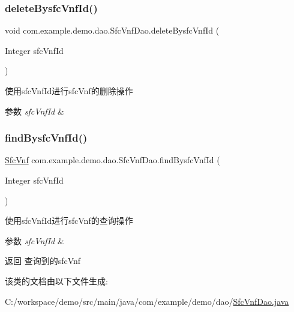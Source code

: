 \subsubsection{\texorpdfstring{delete\+Bysfc\+Vnf\+Id()}{deleteBysfcVnfId()}}
{\footnotesize\ttfamily void com.\+example.\+demo.\+dao.\+Sfc\+Vnf\+Dao.\+delete\+Bysfc\+Vnf\+Id (\begin{DoxyParamCaption}\item[{Integer}]{sfc\+Vnf\+Id }\end{DoxyParamCaption})}

使用sfc\+Vnf\+Id进行sfc\+Vnf的删除操作 
\begin{DoxyParams}{参数}
{\em sfc\+Vnf\+Id} & \\
\hline
\end{DoxyParams}
\mbox{\label{interfacecom_1_1example_1_1demo_1_1dao_1_1_sfc_vnf_dao_a2b0be412a2ac9b8c9413e4e9b7eddb40}} 
\subsubsection{\texorpdfstring{find\+Bysfc\+Vnf\+Id()}{findBysfcVnfId()}}
{\footnotesize\ttfamily \mbox{\hyperlink{classcom_1_1example_1_1demo_1_1modular_1_1_sfc_vnf}{Sfc\+Vnf}} com.\+example.\+demo.\+dao.\+Sfc\+Vnf\+Dao.\+find\+Bysfc\+Vnf\+Id (\begin{DoxyParamCaption}\item[{Integer}]{sfc\+Vnf\+Id }\end{DoxyParamCaption})}

使用sfc\+Vnf\+Id进行sfc\+Vnf的查询操作 
\begin{DoxyParams}{参数}
{\em sfc\+Vnf\+Id} & \\
\hline
\end{DoxyParams}
\begin{DoxyReturn}{返回}
查询到的sfc\+Vnf 
\end{DoxyReturn}


该类的文档由以下文件生成\+:\begin{DoxyCompactItemize}
\item 
C\+:/workspace/demo/src/main/java/com/example/demo/dao/\mbox{\hyperlink{_sfc_vnf_dao_8java}{Sfc\+Vnf\+Dao.\+java}}\end{DoxyCompactItemize}
